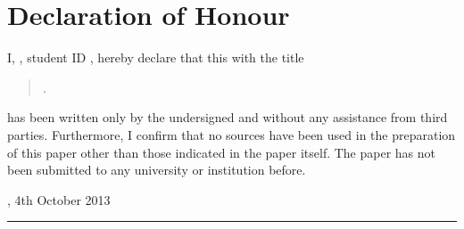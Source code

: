 
\chapter*{Declaration of Honour}

\thispagestyle{empty}

I, \myAuthor, student ID \studentID, hereby declare that this \kind\xspace with the title

\begin{quote}
\textit{\myTitle. \mySubtitle}
\end{quote}

has been written only by the undersigned and without any assistance from third parties. Furthermore, I confirm that no sources have been used in the preparation of this paper other than those indicated in the paper itself. The paper has not been submitted to any university or institution before.

\vspace{8ex}

\place, 4th October 2013

\vspace{6ex}

\rule[-0.2cm]{5cm}{0.5pt}

\textsc{\myAuthor} 
